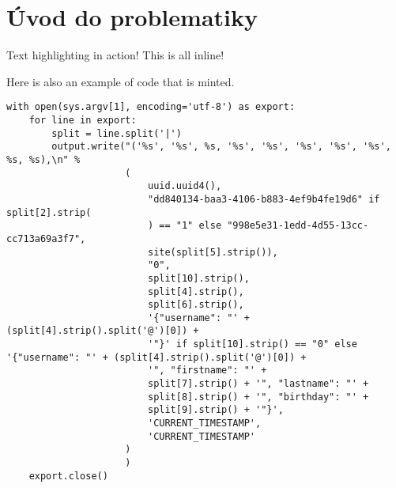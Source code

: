\chapter{Úvod do problematiky}
\par \lipsum[3]
\cite{coplienOredevDCI}

\par Text highlighting in {\btHL action}! {\btHL This is all inline!}

\par Here is also an example of code that is {\btHL minted}.
\begin{verbatim}
with open(sys.argv[1], encoding='utf-8') as export:
	for line in export:
		split = line.split('|')
		output.write("('%s', '%s', %s, '%s', '%s', '%s', '%s', '%s', %s, %s),\n" %
					 (
						 uuid.uuid4(),
						 "dd840134-baa3-4106-b883-4ef9b4fe19d6" if split[2].strip(
						 ) == "1" else "998e5e31-1edd-4d55-13cc-cc713a69a3f7",
						 site(split[5].strip()),
						 "0",
						 split[10].strip(),
						 split[4].strip(),
						 split[6].strip(),
						 '{"username": "' + (split[4].strip().split('@')[0]) +
						 '"}' if split[10].strip() == "0" else '{"username": "' + (split[4].strip().split('@')[0]) +
						 '", "firstname": "' +
						 split[7].strip() + '", "lastname": "' +
						 split[8].strip() + '", "birthday": "' +
						 split[9].strip() + '"}',
						 'CURRENT_TIMESTAMP',
						 'CURRENT_TIMESTAMP'
					 )
					 )
	export.close()
\end{verbatim}

\par \lipsum[8]
\cite{coplienGOTODCI}
\par {}
